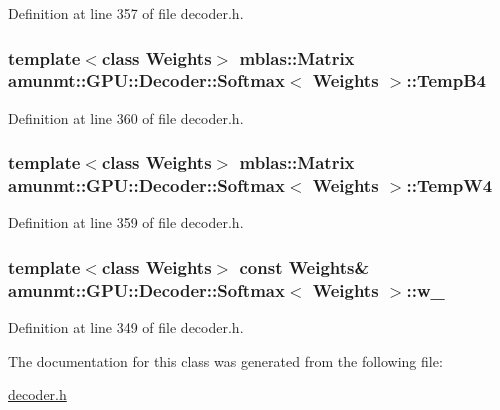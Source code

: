 Definition at line 357 of file decoder.\+h.

\subsubsection[{\texorpdfstring{Temp\+B4}{TempB4}}]{\setlength{\rightskip}{0pt plus 5cm}template$<$class Weights$>$ {\bf mblas\+::\+Matrix} {\bf amunmt\+::\+G\+P\+U\+::\+Decoder\+::\+Softmax}$<$ {\bf Weights} $>$\+::Temp\+B4\hspace{0.3cm}{\ttfamily [private]}}\hypertarget{classamunmt_1_1GPU_1_1Decoder_1_1Softmax_a7e627e54910acdb3b0f02c08e7671d9a}{}\label{classamunmt_1_1GPU_1_1Decoder_1_1Softmax_a7e627e54910acdb3b0f02c08e7671d9a}


Definition at line 360 of file decoder.\+h.

\subsubsection[{\texorpdfstring{Temp\+W4}{TempW4}}]{\setlength{\rightskip}{0pt plus 5cm}template$<$class Weights$>$ {\bf mblas\+::\+Matrix} {\bf amunmt\+::\+G\+P\+U\+::\+Decoder\+::\+Softmax}$<$ {\bf Weights} $>$\+::Temp\+W4\hspace{0.3cm}{\ttfamily [private]}}\hypertarget{classamunmt_1_1GPU_1_1Decoder_1_1Softmax_af6d96b67f2e1a18b692fc5a0f016e0d0}{}\label{classamunmt_1_1GPU_1_1Decoder_1_1Softmax_af6d96b67f2e1a18b692fc5a0f016e0d0}


Definition at line 359 of file decoder.\+h.

\subsubsection[{\texorpdfstring{w\+\_\+}{w_}}]{\setlength{\rightskip}{0pt plus 5cm}template$<$class Weights$>$ const {\bf Weights}\& {\bf amunmt\+::\+G\+P\+U\+::\+Decoder\+::\+Softmax}$<$ {\bf Weights} $>$\+::w\+\_\+\hspace{0.3cm}{\ttfamily [private]}}\hypertarget{classamunmt_1_1GPU_1_1Decoder_1_1Softmax_ae2e313f9d4f7b068c99ae73e97f91c41}{}\label{classamunmt_1_1GPU_1_1Decoder_1_1Softmax_ae2e313f9d4f7b068c99ae73e97f91c41}


Definition at line 349 of file decoder.\+h.



The documentation for this class was generated from the following file\+:\begin{DoxyCompactItemize}
\item 
\hyperlink{decoder_8h}{decoder.\+h}\end{DoxyCompactItemize}
